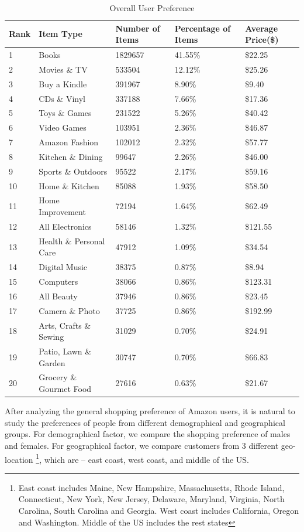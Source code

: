 \begin{table}[t]
\centering
\caption{Overall User Preference}
\label{tb:overall}
\begin{adjustbox}{max width=.5\textwidth}
\begin{tabular}{lllll}
Rank & Item Type          & Number of Items & Percentage of Items & Average Price(\$) \\ \hline
1 & Books & 1829657 & 41.55\% & \$22.25 \\
2 & Movies \& TV & 533504 & 12.12\% & \$25.26 \\
3 & Buy a Kindle & 391967 & 8.90\% & \$9.40 \\
4 & CDs \& Vinyl & 337188 & 7.66\% & \$17.36 \\
5 & Toys \& Games & 231522 & 5.26\% & \$40.42 \\
6 & Video Games & 103951 & 2.36\% & \$46.87 \\
7 & Amazon Fashion & 102012 & 2.32\% & \$57.77 \\
8 & Kitchen \& Dining & 99647 & 2.26\% & \$46.00 \\
9 & Sports \& Outdoors & 95522 & 2.17\% & \$59.16 \\
10 & Home \& Kitchen & 85088 & 1.93\% & \$58.50 \\
11 & Home Improvement & 72194 & 1.64\% & \$62.49 \\
12 & All Electronics & 58146 & 1.32\% & \$121.55 \\
13 & Health \& Personal Care & 47912 & 1.09\% & \$34.54 \\
14 & Digital Music & 38375 & 0.87\% & \$8.94 \\
15 & Computers & 38066 & 0.86\% & \$123.31 \\
16 & All Beauty & 37946 & 0.86\% & \$23.45 \\
17 & Camera \& Photo & 37725 & 0.86\% & \$192.99 \\
18 & Arts, Crafts \& Sewing & 31029 & 0.70\% & \$24.91 \\
19 & Patio, Lawn \& Garden & 30747 & 0.70\% & \$66.83 \\
20 & Grocery \& Gourmet Food & 27616 & 0.63\% & \$21.67 \\
\end{tabular}
\end{adjustbox}
\end{table}

After analyzing the general shopping preference of Amazon users, it is natural to study the preferences of people from different demographical and geographical groups. For demographical factor, we compare the shopping preference of males and females. For geographical factor, we compare customers from 3 different geo-location \footnote{East coast includes Maine, New Hampshire, Massachusetts, Rhode Island, Connecticut, New York, New Jersey, Delaware, Maryland, Virginia, North Carolina, South Carolina and Georgia. West coast includes California, Oregon and Washington. Middle of the US includes the rest states}, which are -- east coast, west coast, and middle of the US. 

